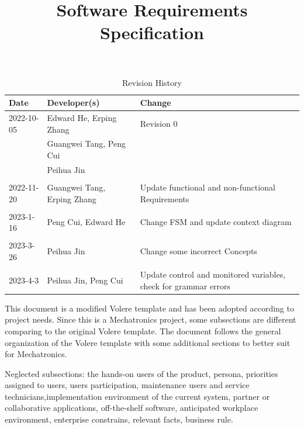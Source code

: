 \documentclass[12pt]{article}
\title{Software Requirements Specification\\\progname}
\author{\authname}
\date{}
\begin{document}
\maketitle

\newpage
\begin{table}[hp]
\caption{Revision History} \label{TblRevisionHistory}
\begin{tabularx}{\textwidth}{llX}
\toprule
\textbf{Date} & \textbf{Developer(s)} & \textbf{Change}\\
\midrule
2022-10-05 & Edward He, Erping Zhang & Revision 0\\
& Guangwei Tang, Peng Cui & \\
& Peihua Jin & \\\\
2022-11-20 & Guangwei Tang, Erping Zhang & Update functional and non-functional Requirements\\\\
2023-1-16 & Peng Cui, Edward He & Change FSM and update context diagram\\\\
2023-3-26 & Peihua Jin & Change some incorrect Concepts\\\\
2023-4-3 & Peihua Jin, Peng Cui & Update control and monitored variables, check for grammar errors\\
\bottomrule
\end{tabularx}
\end{table}


This document is a modified Volere template and has been adopted according to project needs. Since this is a Mechatronics project, some subsections are different comparing to the original Volere template. The document follows the general organization of the Volere template with some additional sections to better suit for Mechatronics. 

Neglected subsections: the hands-on users of the product, persona, priorities assigned to users, users participation, maintenance users and service technicians,implementation environment of the current system, partner or collaborative applications, off-the-shelf software, anticipated workplace environment, enterprise constrains, relevant facts, business rule.
\newpage


\tableofcontents

\newpage



\listoftables
\listoffigures

\newpage
\end{document}
